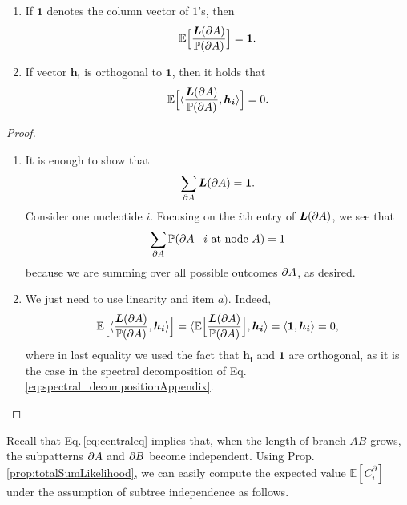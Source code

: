 \begin{appendices}
\begin{prop}
\smallskip


\begin{enumerate}[label=\alph*)]
\item If $\bm{1}$ denotes the column vector of $1$'s, then
\begin{equation*} \label{eq:expected1}
\mathbb{E}\Big[\frac{{ \bm{L}(\partial A) }}{\mathbb{P}({\partial A})}\Big] = \bm{1}.
 \end{equation*}
\item If vector $\bm{h_i}$ is orthogonal to $\bm{1}$, then it holds that
 \begin{equation*}\label{eq:expectedscalar0}
 \mathbb{E}\Big[\langle \frac{{ \bm{L}(\partial A) }}{\mathbb{P}({\partial A})}, \bm{h_i}\rangle\Big] = 0.
 \end{equation*}
 \end{enumerate}
\end{prop}
\begin{proof} \hfill


\begin{enumerate}[label=\alph*)]
\item It  is enough to show that 
 \begin{equation} \label{eq:sum1}
      \sum _{\partial A} { \bm{L}(\partial A) } = \bm{1}.
 \end{equation}
Consider one nucleotide $i$. Focusing on the $i$th entry of ${ \bm{L}(\partial A) }$, we see that \[\sum_{\partial A} \mathbb{P}({\partial A}  \mid  \text{$i$ at node $A$}) = 1\]
because we are summing over all possible outcomes ${\partial A}$, as desired.
\item We just need to use linearity and item $a)$. Indeed,
\begin{equation}
\mathbb{E}\Big[\langle \frac{{ \bm{L}(\partial A) }}{\mathbb{P}({\partial A})}, \bm{h_i}\rangle\Big] =\langle  \mathbb{E}\Big[\frac{{ \bm{L}(\partial A) }}{\mathbb{P}({\partial A})}\Big], \bm{h_i}\rangle = \langle  \bm{1}, \bm{h_i}\rangle = 0,
\end{equation} 
where in last equality we used the fact that $\bm{h_i}$ and $\bm{1}$ are orthogonal, as it is the case in the spectral decomposition of Eq.\,\eqref{eq:spectral_decompositionAppendix}.
\end{enumerate}
\end{proof}

Recall that Eq.\,\eqref{eq:centraleq} implies that, when the length of branch $AB$ grows, the subpatterns ${\partial A}$ and ${\partial B}$ become independent. Using Prop. \ref{prop:totalSumLikelihood}, we can easily compute the expected value $\mathbb{E}[C^\partial_i]$ under the assumption of subtree independence as follows. 


\end{appendices}
